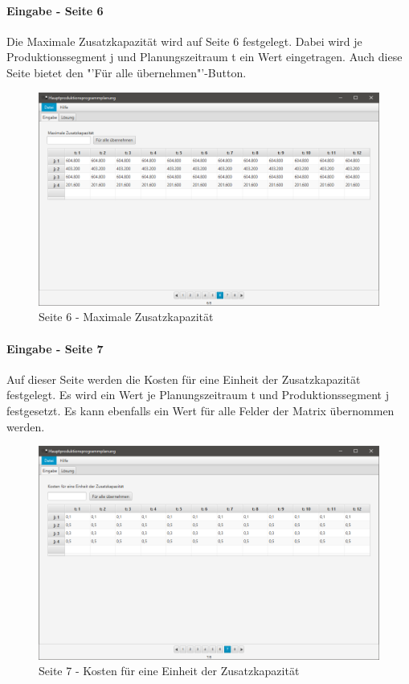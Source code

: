 \documentclass[12pt,a4paper, listof=entryprefix, bibliography=totocnumbered,toc=listofnumbered,lof=listofnumbered]{scrartcl}
\begin{document}
\paragraph{Eingabe - Seite 6}
Die Maximale Zusatzkapazität wird auf Seite 6 festgelegt. Dabei wird je Produktionssegment j und Planungszeitraum t ein Wert eingetragen. Auch diese Seite bietet den "'Für alle übernehmen"'-Button.

\begin{figure}[H]
	\centering
	\includegraphics[width=.8\linewidth]{images/seite6.png} 
	\caption{Seite 6 - Maximale Zusatzkapazität}
	\label{fig:seite6}
\end{figure}

\paragraph{Eingabe - Seite 7}
Auf dieser Seite werden die Kosten für eine Einheit der Zusatzkapazität festgelegt. Es wird ein Wert je Planungszeitraum t und Produktionssegment j festgesetzt. Es kann ebenfalls ein Wert für alle Felder der Matrix übernommen werden.

\begin{figure}[H]
	\centering
	\includegraphics[width=.8\linewidth]{images/seite7.png} 
	\caption{Seite 7 - Kosten für eine Einheit der Zusatzkapazität}
	\label{fig:seite7}
\end{figure}
\end{document}
